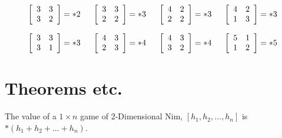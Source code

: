 \documentclass[11pt]{article}
\begin{document}
$$\left[
\begin{array}{ c c }
3 & 3 \\
3 & 2
\end{array}
\right]
= \ast 2 \hspace{0.2in}
\left[
\begin{array}{ c c }
3 & 3 \\
2 & 2
\end{array}
\right]
= \ast 3 \hspace{0.2in}
\left[
\begin{array}{ c c }
4 & 2 \\
2 & 2
\end{array}
\right]
= \ast 3 \hspace{0.2in}
\left[
\begin{array}{ c c }
4 & 2 \\
1 & 3
\end{array}
\right]
= \ast 3
$$

$$
\left[
\begin{array}{ c c }
3 & 3 \\
3 & 1
\end{array}
\right]
= \ast 3  \hspace{0.2in}
\left[
\begin{array}{ c c }
4 & 3 \\
2 & 3
\end{array}
\right]
= \ast 4 \hspace{0.2in}
\left[
\begin{array}{ c c }
4 & 3 \\
3 & 2
\end{array}
\right]
= \ast 4 \hspace{0.2in}
\left[
\begin{array}{ c c }
5 & 1 \\
1 & 2
\end{array}
\right]
= \ast 5
$$


\section{Theorems etc.}
 The value of a $1\times n$ game of 2-Dimensional Nim, $\left[ h_1, h_2,\ldots, h_n \right]$ is $\ast\left( h_1+h_2+\ldots+h_n \right) $.
\end{document}
